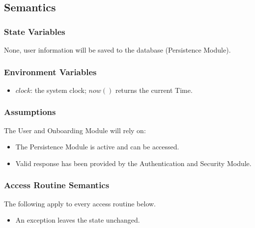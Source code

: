 \documentclass[12pt, titlepage]{article}
\begin{document}
\subsection{Semantics}

\subsubsection{State Variables}
None, user information will be saved to the database (Persistence Module).

\subsubsection{Environment Variables}
\begin{itemize}
    \item $\mathit{clock}$: the system clock; $\mathit{now}()$ returns the current Time.
\end{itemize}


\subsubsection{Assumptions}
The User and Onboarding Module will rely on:
\begin{itemize}
    \item The Persistence Module is active and can be accessed.
    \item Valid response has been provided by the Authentication and Security Module.
\end{itemize}

\subsubsection{Access Routine Semantics}
\noindent The following apply to every access routine below.
\begin{itemize}
    \item An exception leaves the state unchanged.
\end{itemize}
\end{document}

